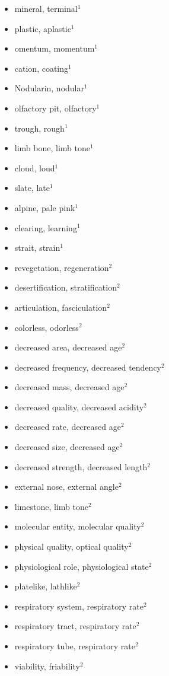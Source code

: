 \begin{itemize}
  \item mineral, terminal$^1$
  \item plastic, aplastic$^1$
  \item omentum, momentum$^1$
  \item cation, coating$^1$
  \item Nodularin, nodular$^1$
  \item olfactory pit, olfactory$^1$
  \item trough, rough$^1$
  \item limb bone, limb tone$^1$
  \item cloud, loud$^1$
  \item slate, late$^1$
  \item alpine, pale pink$^1$
  \item clearing, learning$^1$
  \item strait, strain$^1$
  \item revegetation, regeneration$^2$
  \item desertification, stratification$^2$
  \item articulation, fasciculation$^2$
  \item colorless, odorless$^2$
  \item decreased area, decreased age$^2$
  \item decreased frequency, decreased tendency$^2$
  \item decreased mass, decreased age$^2$
  \item decreased quality, decreased acidity$^2$
  \item decreased rate, decreased age$^2$
  \item decreased size, decreased age$^2$
  \item decreased strength, decreased length$^2$
  \item external nose, external angle$^2$
  \item limestone, limb tone$^2$
  \item molecular entity, molecular quality$^2$
  \item physical quality, optical quality$^2$
  \item physiological role, physiological state$^2$
  \item platelike, lathlike$^2$
  \item respiratory system, respiratory rate$^2$
  \item respiratory tract, respiratory rate$^2$
  \item respiratory tube, respiratory rate$^2$
  \item viability, friability$^2$
\end{itemize}
